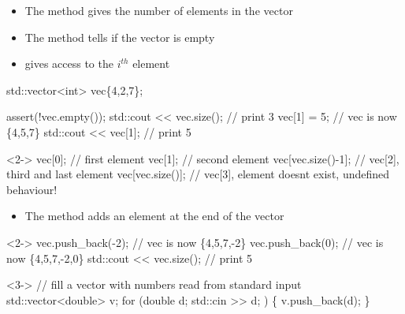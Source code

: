 \begin{frame}[fragile]{ \insertcontinuationtext}

  \begin{itemize}
  \item The  method gives the number of elements in the vector
  \item The  method tells if the vector is empty
  \item {} gives access to the $i^{th}$ element
  \end{itemize}

  \begin{codeblock}
std::vector<int> vec\{4,2,7\};

assert(!vec.empty());
std::cout << vec.size(); // print 3
vec[1] = 5;              // vec is now \{4,5,7\}
std::cout << vec[1];     // print 5\end{codeblock}


  \begin{codeblock}<2->{
vec[0];            // first element
vec[1];            // second element
vec[vec.size()-1]; // vec[2], third and last element
vec[vec.size()];   // vec[3], element doesn\textquotesingle{}t exist, undefined behaviour!}\end{codeblock}

\end{frame}

\begin{frame}[fragile]{ \insertcontinuationtext}
  \begin{itemize}
  \item The  method adds an element at the end of the vector
  \end{itemize}

  \begin{codeblock}<2->{
vec.push_back(-2);       // vec is now \{4,5,7,-2\}
vec.push_back(0);        // vec is now \{4,5,7,-2,0\}
std::cout << vec.size(); // print 5}\end{codeblock}

    \begin{codeblock}<3->{
// fill a vector with numbers read from standard input
std::vector<double> v;
for (double d; std::cin >> d; ) \{
  v.push_back(d);
\}}\end{codeblock}

\end{frame}

